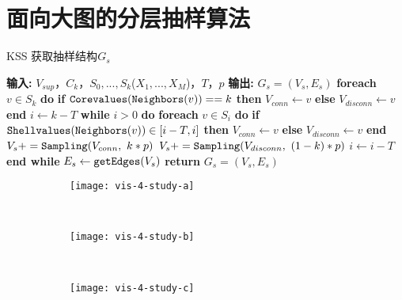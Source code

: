 \chapter{面向大图的分层抽样算法}\label{chap:面向大图的分层抽样算法}

    \begin{algorithm}[!htbp]
        \small
        \caption{KSS 获取抽样结构$G_s$}\label{alg:k-ss-03}
        \begin{algorithmic}[1]
            \State \textbf{输入:} $V_{sup}$，$C_k$，$S_0,...,S_k$($X_1,...,X_M$)，$T$，$p$
            \State \textbf{输出:} $G_s=(V_s,E_s)$
            \State \textbf{foreach} $v \in S_k$ \textbf{do}
            \State     \qquad \textbf{if} $\verb"Corevalues"(\verb"Neighbors"(v))==k$ \textbf{then} $V_{conn} \leftarrow v$
            \State     \qquad \textbf{else} $V_{disconn} \leftarrow v$
            \State \textbf{end }
            \State $i \leftarrow k-T$
            \State \textbf{while} $i > 0$ \textbf{do}
            \State     \qquad \textbf{foreach} $v \in S_i$ \textbf{do}
            \State     \qquad \qquad \textbf{if} $\verb"Shellvalues"(\verb"Neighbors"(v))\in[i-T,i]$ \textbf{then} $V_{conn} \leftarrow v$
            \State     \qquad \qquad  \textbf{else} $V_{disconn} \leftarrow v$
            \State     \qquad \textbf{end }
            \State     \qquad $V_s+=\verb"Sampling"(V_{conn},~k*p)$
            \State     \qquad $V_s+=\verb"Sampling"(V_{disconn},~(1-k)*p)$
            \State     \qquad $i \leftarrow i - T$
            \State \textbf{end while}
            \State $E_s \leftarrow \verb"getEdges"(V_s)$
            \State \textbf{return} $G_s=(V_s,E_s)$
        \end{algorithmic}
    \end{algorithm}


    \begin{figure}[!htbp]
        \begin{subfigure}[b]{0.31\textwidth}
          \texttt{[image: vis-4-study-a]}
          \caption{}
          \label{fig:vis-4-study-a}
        \end{subfigure}
        ~
        \centering
        \begin{subfigure}[b]{0.31\textwidth}
          \texttt{[image: vis-4-study-b]}
          \caption{}
          \label{fig:vis-4-study-b}
        \end{subfigure}%
        ~~%
        \centering
        \begin{subfigure}[b]{0.31\textwidth}
          \texttt{[image: vis-4-study-c]}
          \caption{}
          \label{fig:vis-4-study-c}
        \end{subfigure}%
        \label{fig:vis-4-study}
    \end{figure}



